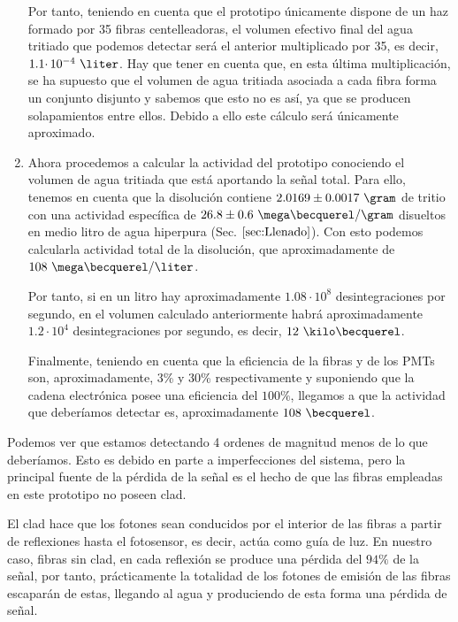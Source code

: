 \begin{enumerate}
Por tanto, teniendo en cuenta que el prototipo únicamente dispone de un haz formado por 35 fibras centelleadoras, el volumen efectivo final del agua tritiado que podemos detectar será el anterior multiplicado por 35, es decir, $1.1 \cdotp 10^{-4}~\liter$. Hay que tener en cuenta que, en esta última multiplicación, se ha supuesto que el volumen de agua tritiada asociada a cada fibra forma un conjunto disjunto y sabemos que esto no es así, ya que se producen solapamientos entre ellos. Debido a ello este cálculo será únicamente aproximado.

\item{} Ahora procedemos a calcular la actividad del prototipo conociendo el volumen de agua tritiada que está aportando  la señal total. Para ello, tenemos en cuenta que la disolución contiene $2.0169 \pm 0.0017~\gram$ de tritio con una actividad específica de $26.8 \pm 0.6~\mega\becquerel/\gram$ disueltos en medio litro de agua hiperpura (Sec. $\ref{sec:Llenado}$). Con esto podemos calcularla actividad total de la disolución, que aproximadamente de $108~\mega\becquerel/\liter$. 

Por tanto, si en un litro hay aproximadamente $1.08\cdotp 10^{8}$ desintegraciones por segundo, en el volumen calculado anteriormente habrá aproximadamente $1.2\cdotp 10^{4}$ desintegraciones por segundo, es decir, $12~\kilo\becquerel$.

Finalmente, teniendo en cuenta que la eficiencia de la fibras y de los PMTs son, aproximadamente, 3\% y 30\% respectivamente y suponiendo que la cadena electrónica posee una eficiencia del $100\%$, llegamos a que la actividad que deberíamos detectar es, aproximadamente $108~\becquerel$.

\end{enumerate}

Podemos ver que estamos detectando 4 ordenes de magnitud menos de lo que deberíamos. Esto es debido en parte a imperfecciones del sistema, pero la principal fuente de la pérdida de la señal es  el hecho de que las fibras empleadas en este prototipo no poseen clad. 

El clad hace que los fotones sean conducidos por el interior de las fibras a partir de reflexiones hasta el fotosensor, es decir, actúa como guía de luz. En nuestro caso, fibras sin clad, en cada reflexión se produce una pérdida del $94\%$ de la señal, por tanto, prácticamente la totalidad de los fotones de emisión de las fibras escaparán de estas, llegando al agua y produciendo de esta forma una pérdida de señal. 


